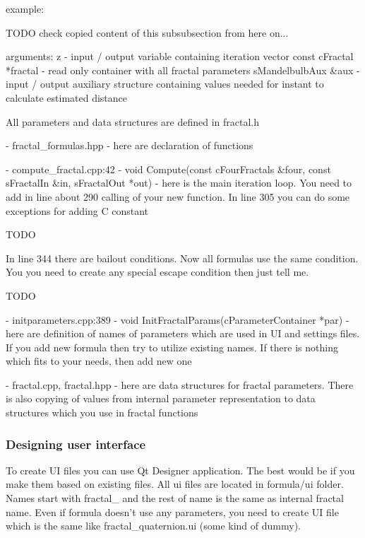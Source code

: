example:


TODO check copied content of this subsubsection from here on...

arguments:
z - input / output variable containing iteration vector
const cFractal *fractal - read only container with all fractal parameters
sMandelbulbAux \&aux - input / output auxiliary structure containing values needed for instant to calculate estimated distance

All parameters and data structures are defined in fractal.h

- fractal\_formulas.hpp - here are declaration of functions

- compute\_fractal.cpp:42 - void Compute(const cFourFractals \&four, const sFractalIn \&in, sFractalOut *out) - here is the main iteration loop. You need to add in line about 290 calling of your new function.
  In line 305 you can do some exceptions for adding C constant

		TODO

  In line 344 there are bailout conditions. Now all formulas use the same condition. You you need to create any special escape condition then just tell me.

TODO

- initparameters.cpp:389 - void InitFractalParams(cParameterContainer *par) - here are definition of names of parameters which are used in UI and settings files. If you add new formula then try to utilize existing names. If there is nothing which fits to your needs, then add new one

- fractal.cpp, fractal.hpp - here are data structures for fractal parameters. There is also copying of values from internal parameter representation to data structures which you use in fractal functions

\subsubsection{Designing user interface}\label{developers-designing-user-interface}

To create UI files you can use Qt Designer application. The best would be if you make them based on existing files. All ui files are located in formula/ui folder. Names start with fractal\_ and the rest of name is the same as internal fractal name. Even if formula doesn't use any parameters, you need to create UI file which is the same like fractal\_quaternion.ui (some kind of dummy).

